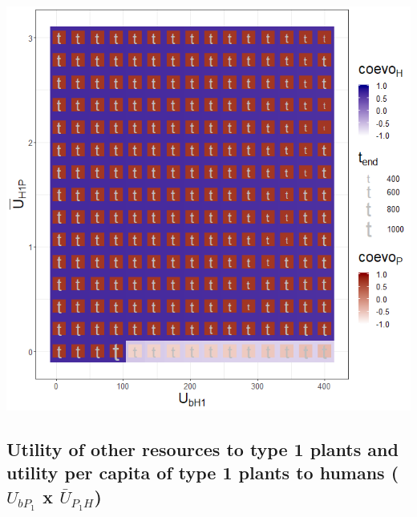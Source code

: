 \documentclass[]{book}
\begin{document}

\includegraphics[width=1\linewidth]{plots/3_twoPar-U.bH1-mU.H1P_plot}

\newpage

\hypertarget{utility-of-other-resources-to-type-1-plants-and-utility-per-capita-of-type-1-plants-to-humans-u_bp_1-x-baru_p_1h}{%
\subsection{\texorpdfstring{Utility of other resources to type 1 plants and utility per capita of type 1 plants to humans (\(U_{bP_{1}}\) x \(\bar{U}_{P_{1}H}\))}{Utility of other resources to type 1 plants and utility per capita of type 1 plants to humans (U\_\{bP\_\{1\}\} x \textbackslash{}bar\{U\}\_\{P\_\{1\}H\})}}\label{utility-of-other-resources-to-type-1-plants-and-utility-per-capita-of-type-1-plants-to-humans-u_bp_1-x-baru_p_1h}}
\end{document}
